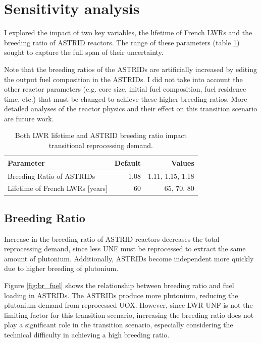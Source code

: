 \section{Sensitivity analysis}

I explored the impact of two key variables, the lifetime of French
\glspl{LWR} and the breeding ratio of \gls{ASTRID} reactors. The range
of these parameters (table \ref{tab:sen_par}) sought to capture the full
span of their uncertainty.

Note that the breeding ratios of the \glspl{ASTRID} are artificially increased
by editing the output fuel composition in the \glspl{ASTRID}. I did not 
take into account the other reactor parameters (e.g. core size, initial
fuel composition, fuel residence time, etc.)
that must be changed to achieve these higher breeding ratios. More detailed analyses
of the reactor physics and their effect on this transition scenario are future work.

\begin{table}[h]
    \centering
    \caption{Both \gls{LWR} lifetime and \gls{ASTRID} breeding ratio impact 
    transitional reprocessing demand.}
    \begin{tabular}{lrr}
        \hline
        \textbf{Parameter} & \textbf{Default} & \textbf{Values} \\
        \hline
        Breeding Ratio of \glspl{ASTRID} & 1.08 & 1.11, 1.15, 1.18 \\ 
        Lifetime of French \glspl{LWR} [years] & 60  & 65, 70, 80 \\
        \hline
    \end{tabular}
    \label{tab:sen_par}
\end{table}

\subsection{Breeding Ratio}


Increase in the breeding ratio of \gls{ASTRID} reactors
decreases the total reprocessing demand, since less
\gls{UNF} must be reprocessed to extract the same amount of
plutonium. Additionally,
\glspl{ASTRID} become independent more quickly due to
higher breeding of plutonium.

Figure \ref{fig:br_fuel} shows the relationship between breeding ratio and fuel loading in \glspl{ASTRID}.
The \glspl{ASTRID} produce 
more plutonium, reducing the plutonium demand from 
reprocessed \gls{UOX}. However, since \gls{LWR} \gls{UNF} is not
the limiting factor for this transition scenario,
increasing the breeding ratio does not play a significant
role in the transition scenario, especially considering the technical difficulty
in achieving a high breeding ratio.

